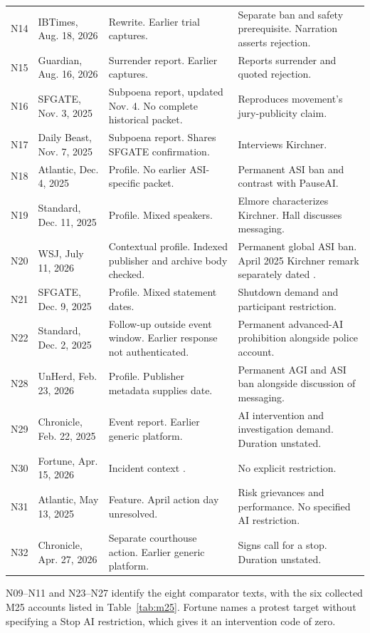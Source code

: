 \documentclass[11pt]{article}
\begin{document}
\begin{longtable}{P{0.05\textwidth}P{0.20\textwidth}P{0.27\textwidth}P{0.36\textwidth}}
N14 & IBTimes, Aug. 18, 2026 & Rewrite. Earlier trial captures. & Separate ban and safety prerequisite. Narration asserts rejection.\\
N15 & Guardian, Aug. 16, 2026 & Surrender report. Earlier captures. & Reports surrender and quoted rejection.\\
N16 & SFGATE, Nov. 3, 2025 & Subpoena report, updated Nov. 4. No complete historical packet. & Reproduces movement's jury-publicity claim.\\
N17 & Daily Beast, Nov. 7, 2025 & Subpoena report. Shares SFGATE confirmation. & Interviews Kirchner.\\
N18 & Atlantic, Dec. 4, 2025 & Profile. No earlier ASI-specific packet. & Permanent ASI ban and contrast with PauseAI.\\
N19 & Standard, Dec. 11, 2025 & Profile. Mixed speakers. & Elmore characterizes Kirchner. Hall discusses messaging.\\
N20 & WSJ, July 11, 2026 & Contextual profile. Indexed publisher and archive body checked. & Permanent global ASI ban. April 2025 Kirchner remark separately dated \citep{wsj}.\\
N21 & SFGATE, Dec. 9, 2025 & Profile. Mixed statement dates. & Shutdown demand and participant restriction.\\
N22 & Standard, Dec. 2, 2025 & Follow-up outside event window. Earlier response not authenticated. & Permanent advanced-AI prohibition alongside police account.\\
N28 & UnHerd, Feb. 23, 2026 & Profile. Publisher metadata supplies date. & Permanent AGI and ASI ban alongside discussion of messaging.\\
N29 & Chronicle, Feb. 22, 2025 & Event report. Earlier generic platform. & AI intervention and investigation demand. Duration unstated.\\
N30 & Fortune, Apr. 15, 2026 & Incident context \citep{goldman}. & No explicit restriction.\\
N31 & Atlantic, May 13, 2025 & Feature. April action day unresolved. & Risk grievances and performance. No specified AI restriction.\\
N32 & Chronicle, Apr. 27, 2026 & Separate courthouse action. Earlier generic platform. & Signs call for a stop. Duration unstated.\\
\end{longtable}

N09--N11 and N23--N27 identify the eight comparator texts, with the six collected M25 accounts listed in Table~\ref{tab:m25}. Fortune names a protest target without specifying a Stop AI restriction, which gives it an intervention code of zero.
\end{document}
